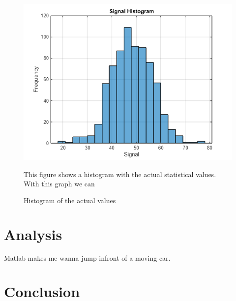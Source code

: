 \documentclass[journal]{IEEEtran}
\begin{document}
\begin{figure}[ht] %
    \centering
    \includegraphics[width=\linewidth]{1.5.png}
    \caption{Histogram of the actual values}
    \vspace{1em} %
    \begin{minipage}{\linewidth}
        \small This figure shows a histogram with the actual statistical values. With this graph we can  
    \end{minipage}
    \label{Part 1: Signal vs Frequency Histogram}
\end{figure}

\section{Analysis}
Matlab makes me wanna jump infront of a moving car.

\section{Conclusion}
\end{document}

